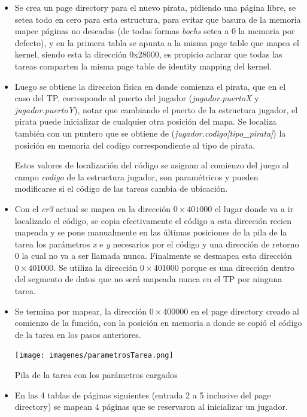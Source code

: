 \begin{itemize}
\item Se crea un page directory para el nuevo pirata, pidiendo una página libre, se
setea todo en cero para esta estructura, para evitar que basura de la memoria
mapee páginas no deseadas (de todas formas {\it bochs\/} setea a 0 la memoria
por defecto), y en la primera tabla se apunta a la misma page table que mapea el
kernel, siendo esta la dirección 0x28000, es propicio aclarar que todas las
tareas comparten la misma page table de identity mapping del kernel.

\item Luego se obtiene la direccion física en donde comienza el pirata, que en
el caso del TP, corresponde al puerto del jugador
({\it jugador.puertoX\/} y {\it jugador.puertoY\/}), notar que cambiando el
puerto de la estructura jugador, el pirata puede inicializar de cualquier otra
posición del mapa. Se localiza también con un puntero que se obtiene de
({\it jugador.codigo[tipo_pirata]}) la posición en memoria del codigo
correspondiente al tipo de pirata.

Estos valores de localización del código se asignan al comienzo del juego al
campo {\it codigo\/} de la estructura jugador, son paramétricos y pueden
modificarse si el código de las tareas cambia de ubicación.

\item Con el {\it cr3\/} actual se mapea en la dirección $0\times401000$ el lugar
donde va a ir localizado el código, se copia efectivamente el código a esta
dirección recien mapeada y se pone manualmente en las últimas posiciones de la
pila de la tarea los parámetros {\it x\/} e {\it y\/} necesarios por el código y
una dirección de retorno 0 la cual no va a ser llamada nunca. Finalmente se
desmapea esta dirección $0\times401000$.
Se utiliza la dirección $0\times401000$ porque es una dirección dentro del
segmento de datos que no será mapeada nunca en el TP por ninguna tarea.

\item Se termina por mapear, la dirección $0\times400000$ en el page directory
creado al comienzo de la función, con la posición en memoria a donde se copió el
código de la tarea en los pasos anteriores.
\begin{center}
\texttt{[image: imagenes/parametrosTarea.png]}

Pila de la tarea con los parámetros cargados
\end{center}

\item En las 4 tablas de páginas siguientes (entrada 2 a 5 inclusive del page
directory) se mapean 4 páginas que se reservaron al inicializar un jugador.


\end{itemize}
